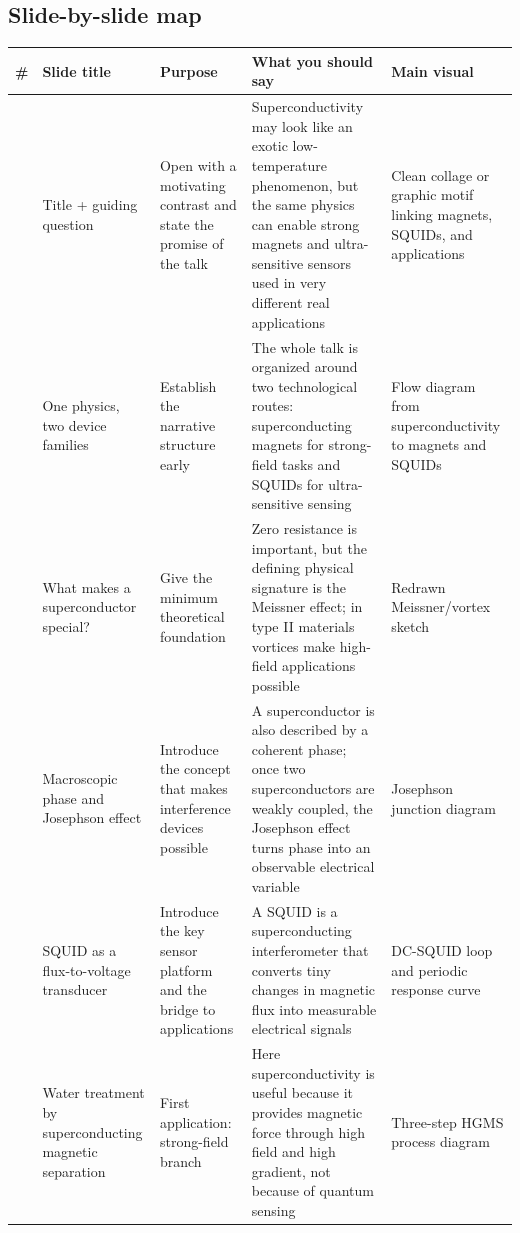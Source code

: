 \documentclass[11pt,a4paper]{article}
\begin{document}
\subsection{Slide-by-slide map}
\begin{center}
\small
\begin{tabular}{>{\raggedright\arraybackslash}p{0.9cm}>{\raggedright\arraybackslash}p{3.2cm}>{\raggedright\arraybackslash}p{3.8cm}>{\raggedright\arraybackslash}p{3.7cm}>{\raggedright\arraybackslash}p{2.6cm}}
\toprule
\textbf{\#} & \textbf{Slide title} & \textbf{Purpose} & \textbf{What you should say} & \textbf{Main visual} \\
\midrule
1 & Title + guiding question & Open with a motivating contrast and state the promise of the talk & Superconductivity may look like an exotic low-temperature phenomenon, but the same physics can enable strong magnets and ultra-sensitive sensors used in very different real applications & Clean collage or graphic motif linking magnets, SQUIDs, and applications \\
2 & One physics, two device families & Establish the narrative structure early & The whole talk is organized around two technological routes: superconducting magnets for strong-field tasks and SQUIDs for ultra-sensitive sensing & Flow diagram from superconductivity to magnets and SQUIDs \\
3 & What makes a superconductor special? & Give the minimum theoretical foundation & Zero resistance is important, but the defining physical signature is the Meissner effect; in type II materials vortices make high-field applications possible & Redrawn Meissner/vortex sketch \\
4 & Macroscopic phase and Josephson effect & Introduce the concept that makes interference devices possible & A superconductor is also described by a coherent phase; once two superconductors are weakly coupled, the Josephson effect turns phase into an observable electrical variable & Josephson junction diagram \\
5 & SQUID as a flux-to-voltage transducer & Introduce the key sensor platform and the bridge to applications & A SQUID is a superconducting interferometer that converts tiny changes in magnetic flux into measurable electrical signals & DC-SQUID loop and periodic response curve \\
6 & Water treatment by superconducting magnetic separation & First application: strong-field branch & Here superconductivity is useful because it provides magnetic force through high field and high gradient, not because of quantum sensing & Three-step HGMS process diagram \\

\end{tabular}
\end{center}
\end{document}
